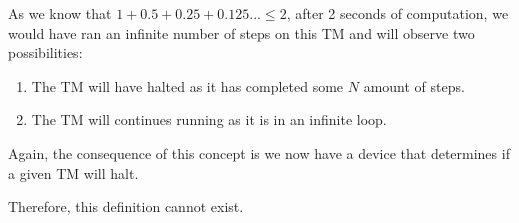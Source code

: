 \documentclass{report}
\begin{document}
As we know that $1 + 0.5 + 0.25 + 0.125 ... \le 2$, after 2 seconds of computation, we would have ran an infinite number of steps on this TM and will observe two possibilities:

\begin{enumerate}
  \item The TM will have halted as it has completed some $N$ amount of steps.
  \item The TM will continues running as it is in an infinite loop.
\end{enumerate}

Again, the consequence of this concept is we now have a device that determines if a given TM will halt.

Therefore, this definition cannot exist.



\end{document}
